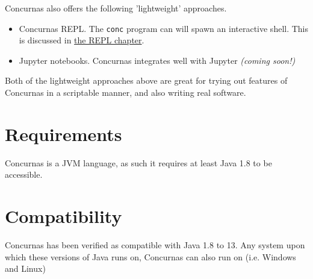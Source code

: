 \documentclass[conc-doc]{subfiles}
\begin{document}
Concurnas also offers the following 'lightweight' approaches.

\begin{itemize}
	\item Concurnas REPL. The \lstinline{conc} program can will spawn an interactive shell. This is discussed in \hyperref[ch:repl]{the REPL chapter}.
	\item Jupyter notebooks. Concurnas integrates well with Jupyter\textit{ (coming soon!)}
\end{itemize}

Both of the lightweight approaches above are great for trying out features of Concurnas in a scriptable manner, and also writing real software.


\section{Requirements}
Concurnas is a JVM language, as such it requires at least Java 1.8 to be accessible.

\section{Compatibility}
Concurnas has been verified as compatible with Java 1.8 to 13. Any system upon which these versions of Java runs on,  Concurnas can also run on (i.e. Windows and Linux)
\end{document}
